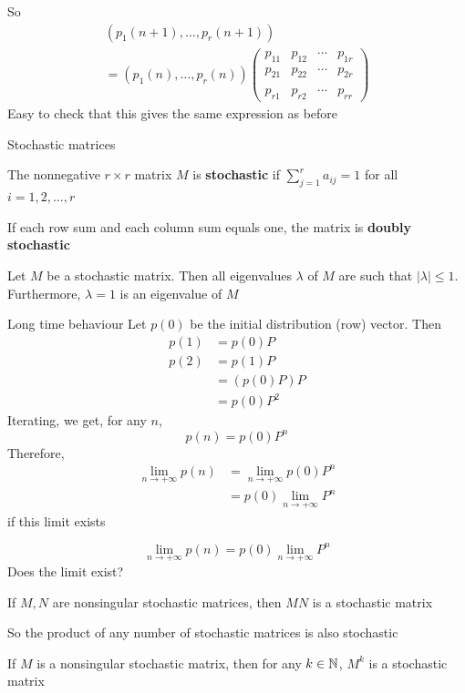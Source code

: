 \documentclass[aspectratio=169]{beamer}
\begin{document}
\begin{frame}
So
\begin{multline*}
(p_1(n+1),\ldots,p_r(n+1))  \\
=
(p_1(n),\ldots,p_r(n)) 
\begin{pmatrix}
p_{11} & p_{12} & \cdots & p_{1r} \\
p_{21} & p_{22} & \cdots & p_{2r} \\
&&& \\
p_{r1} & p_{r2} & \cdots & p_{rr}
\end{pmatrix}
\end{multline*}
\vfill
Easy to check that this gives the same expression as before
\end{frame}



\begin{frame}{Stochastic matrices}
\begin{definition}
The nonnegative $r\times r$ matrix $M$ is \textbf{stochastic} if $\sum_{j=1}^ra_{ij}=1$ for all $i=1,2,\dots, r$
\end{definition}
\vfill
If each row sum and each column sum equals one, the matrix is \textbf{doubly stochastic}
\vfill
\begin{theorem}\label{th:spectrum_stochastic_matrix}
Let $M$ be a stochastic matrix. Then all eigenvalues $\lambda$ of $M$ are such that $|\lambda|\leq 1$. 
Furthermore, $\lambda =1$ is an eigenvalue of $M$
\end{theorem}
\end{frame}

\begin{frame}{Long time behaviour}
Let $p(0)$ be the initial distribution (row) vector. Then
\begin{align*}
p(1) &= p(0)P \\
p(2) &= p(1)P\\
&= (p(0)P)P \\
&= p(0)P^2
\end{align*}
\vfill
Iterating, we get, for any $n$,
\[
p(n)=p(0)P^n
\]
\vfill
Therefore, 
\begin{align*}
\lim_{n\rightarrow +\infty}p(n) &=
\lim_{n\rightarrow +\infty}p(0)P^n \\
&=p(0)\lim_{n\rightarrow +\infty}P^n
\end{align*}
if this limit exists
\end{frame}


\begin{frame}
\[
\lim_{n\rightarrow +\infty}p(n) = 
p(0)\lim_{n\rightarrow +\infty}P^n
\]
Does the limit exist?
\vfill
\begin{theorem}
If $M,N$ are nonsingular stochastic matrices, then $MN$ is a stochastic matrix
\end{theorem}
\vfill
So the product of any number of stochastic matrices is also stochastic
\vfill
\begin{corollary}
If $M$ is a nonsingular stochastic matrix, then for any $k\in\mathbb{N}$, $M^k$ is a stochastic matrix
\end{corollary}
\end{frame}
\end{document}

